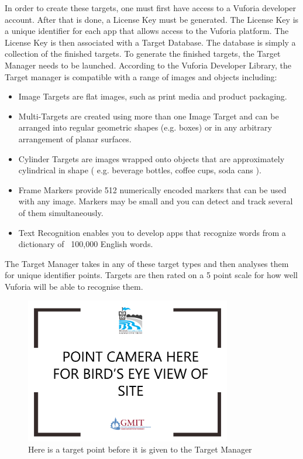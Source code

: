 In order to create these targets, one must first have access to a Vuforia developer account. After that is done, a License Key must be generated. The License Key is a unique identifier for each app that allows access to the Vuforia platform. The License Key is then associated with a Target Database. The database is simply a collection of the finished targets. To generate the finished targets, the Target Manager needs to be launched. According to the Vuforia Developer Library\cite{vuforiastarting}, the Target manager is compatible with a range of images and objects including: 
\begin{itemize}
	\item Image Targets are flat images, such as print media and product packaging.
	
	\item Multi-Targets are created using more than one Image Target and can be arranged into regular geometric shapes (e.g. boxes) or in any arbitrary arrangement of planar surfaces.
	
	\item Cylinder Targets are images wrapped onto objects that are approximately cylindrical in shape ( e.g. beverage bottles, coffee cups, soda cans ).
	
	\item Frame Markers provide 512 numerically encoded markers that can be used with any image. Markers may be small and you can detect and track several of them simultaneously.
	
	\item Text Recognition enables you to develop apps that recognize words from a dictionary of ~100,000 English words.
\end{itemize}

The Target Manager takes in any of these target types and then analyses them for unique identifier points. Targets are then rated on a 5 point scale for how well Vuforia will be able to recognise them.


\begin{figure}[ht!]
	\centering
	\includegraphics[width=90mm]{raw}
	\caption{Here is a target point before it is given to the Target Manager \label{overflow}}
\end{figure}

